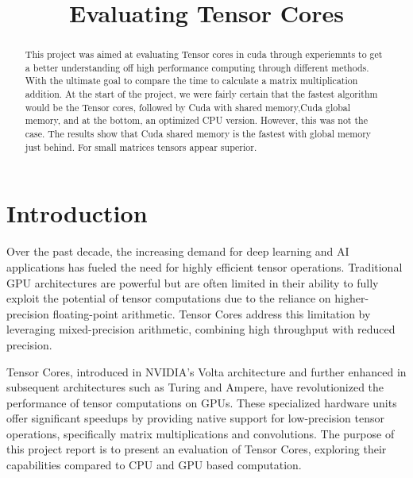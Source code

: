 \documentclass[conference]{IEEEtran}
\begin{document}
\title{Evaluating Tensor Cores}


\author{
}

\maketitle

\begin{abstract}\label{sec:abstract}
This project was aimed at evaluating Tensor cores in cuda through experiemnts to get a better understanding off
high performance computing through different methods. With the ultimate goal to compare the time to calculate a
matrix multiplication addition. At the start of the project, we were fairly certain that the fastest algorithm would be 
the Tensor cores, followed by Cuda with shared memory,Cuda global memory, and at the bottom, an optimized CPU version. However, this was not the case.
The results show that Cuda shared memory is the fastest with global memory just behind. For small matrices tensors appear superior.
\end{abstract}

\section{Introduction}\label{sec:intro}


Over the past decade, the increasing demand for deep learning and AI applications has
fueled the need for highly efficient tensor operations. Traditional GPU architectures are powerful but 
are often limited in their ability to fully exploit the potential of 
tensor computations due to the reliance on higher-precision floating-point arithmetic. 
Tensor Cores address this limitation by leveraging mixed-precision arithmetic, combining 
high throughput with reduced precision.

Tensor Cores, introduced in NVIDIA's Volta architecture and further enhanced in 
subsequent architectures such as Turing and Ampere, have revolutionized the performance of 
tensor computations on GPUs. These specialized hardware units offer significant speedups 
by providing native support for low-precision tensor operations, 
specifically matrix multiplications and convolutions. 
The purpose of this project report is to present an evaluation of Tensor Cores,
exploring their capabilities compared to CPU and GPU based computation.
\end{document}

